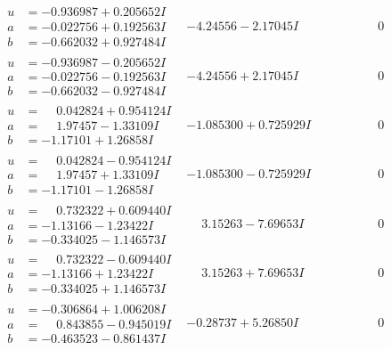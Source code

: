 \documentclass[1p]{elsarticle_modified}
\theoremstyle{definition}
\begin{document}
$$\begin{array}{c|c|c}
\begin{aligned}
u &= -0.936987 + 0.205652 I \\
a &= -0.022756 + 0.192563 I \\
b &= -0.662032 + 0.927484 I\end{aligned}
 & -4.24556 - 2.17045 I & \phantom{-0.000000 } 0 \\ \hline\begin{aligned}
u &= -0.936987 - 0.205652 I \\
a &= -0.022756 - 0.192563 I \\
b &= -0.662032 - 0.927484 I\end{aligned}
 & -4.24556 + 2.17045 I & \phantom{-0.000000 } 0 \\ \hline\begin{aligned}
u &= \phantom{-}0.042824 + 0.954124 I \\
a &= \phantom{-}1.97457 - 1.33109 I \\
b &= -1.17101 + 1.26858 I\end{aligned}
 & -1.085300 + 0.725929 I & \phantom{-0.000000 } 0 \\ \hline\begin{aligned}
u &= \phantom{-}0.042824 - 0.954124 I \\
a &= \phantom{-}1.97457 + 1.33109 I \\
b &= -1.17101 - 1.26858 I\end{aligned}
 & -1.085300 - 0.725929 I & \phantom{-0.000000 } 0 \\ \hline\begin{aligned}
u &= \phantom{-}0.732322 + 0.609440 I \\
a &= -1.13166 - 1.23422 I \\
b &= -0.334025 - 1.146573 I\end{aligned}
 & \phantom{-}3.15263 - 7.69653 I & \phantom{-0.000000 } 0 \\ \hline\begin{aligned}
u &= \phantom{-}0.732322 - 0.609440 I \\
a &= -1.13166 + 1.23422 I \\
b &= -0.334025 + 1.146573 I\end{aligned}
 & \phantom{-}3.15263 + 7.69653 I & \phantom{-0.000000 } 0 \\ \hline\begin{aligned}
u &= -0.306864 + 1.006208 I \\
a &= \phantom{-}0.843855 - 0.945019 I \\
b &= -0.463523 - 0.861437 I\end{aligned}
 & -0.28737 + 5.26850 I & \phantom{-0.000000 } 0 \\ \hline\begin{aligned}

\end{aligned}
\end{array}$$
\end{document}
